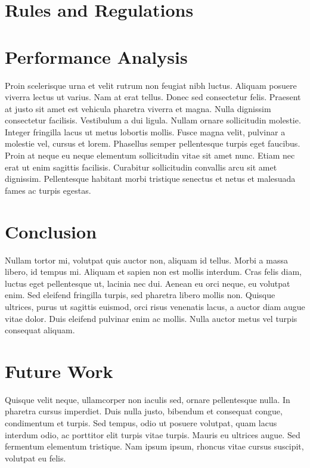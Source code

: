 \documentclass[10pt]{article}
\begin{document}
\begin{multicols}{2}
		\section*{Rules and Regulations}
		

		
		
		\section*{Performance Analysis}
		Proin scelerisque urna et velit rutrum non feugiat nibh luctus. Aliquam posuere viverra lectus ut varius. Nam at erat tellus. Donec sed consectetur felis. Praesent at justo sit amet est vehicula pharetra viverra et magna. Nulla dignissim consectetur facilisis. Vestibulum a dui ligula. Nullam ornare sollicitudin molestie. Integer fringilla lacus ut metus lobortis mollis. Fusce magna velit, pulvinar a molestie vel, cursus et lorem. Phasellus semper pellentesque turpis eget faucibus. Proin at neque eu neque elementum sollicitudin vitae sit amet nunc. Etiam nec erat ut enim sagittis facilisis. Curabitur sollicitudin convallis arcu sit amet dignissim. Pellentesque habitant morbi tristique senectus et netus et malesuada fames ac turpis egestas.
		
		
		\section*{Conclusion}
		Nullam tortor mi, volutpat quis auctor non, aliquam id tellus. Morbi a massa libero, id tempus mi. Aliquam et sapien non est mollis interdum. Cras felis diam, luctus eget pellentesque ut, lacinia nec dui. Aenean eu orci neque, eu volutpat enim. Sed eleifend fringilla turpis, sed pharetra libero mollis non. Quisque ultrices, purus ut sagittis euismod, orci risus venenatis lacus, a auctor diam augue vitae dolor. Duis eleifend pulvinar enim ac mollis. Nulla auctor metus vel turpis consequat aliquam.
		
		\section*{Future Work}
		Quisque velit neque, ullamcorper non iaculis sed, ornare pellentesque nulla. In pharetra cursus imperdiet. Duis nulla justo, bibendum et consequat congue, condimentum et turpis. Sed tempus, odio ut posuere volutpat, quam lacus interdum odio, ac porttitor elit turpis vitae turpis. Mauris eu ultrices augue. Sed fermentum elementum tristique. Nam ipsum ipsum, rhoncus vitae cursus suscipit, volutpat eu felis.

	\end{multicols}
\end{document}
